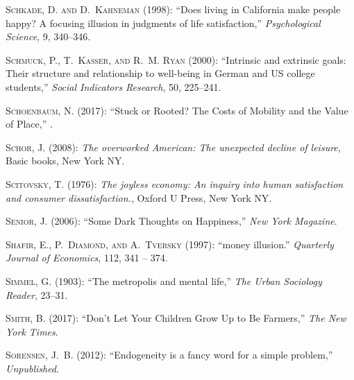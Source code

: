\documentclass[10pt, letterpaper]{article}
\begin{document}
\begin{spacing}{2.0}
\begin{thebibliography}{115}
\textsc{Schkade, D. and D.~Kahneman} (1998): \enquote{{Does living in
  California make people happy? A focusing illusion in judgments of life
  satisfaction},} \emph{Psychological Science}, 9, 340--346.

\textsc{Schmuck, P., T.~Kasser, and R.~M. Ryan} (2000): \enquote{Intrinsic and
  extrinsic goals: Their structure and relationship to well-being in German and
  US college students,} \emph{Social Indicators Research}, 50, 225--241.

\textsc{Schoenbaum, N.} (2017): \enquote{Stuck or Rooted? The Costs of Mobility
  and the Value of Place,} .

\textsc{Schor, J.} (2008): \emph{The overworked American: The unexpected
  decline of leisure}, Basic books, New York NY.

\textsc{Scitovsky, T.} (1976): \emph{The joyless economy: An inquiry into human
  satisfaction and consumer dissatisfaction.}, Oxford U Press, New York NY.

\textsc{Senior, J.} (2006): \enquote{Some Dark Thoughts on Happiness,}
  \emph{New York Magazine}.

\textsc{Shafir, E., P.~Diamond, and A.~Tversky} (1997): \enquote{money
  illusion.} \emph{Quarterly Journal of Economics}, 112, 341 -- 374.

\textsc{Simmel, G.} (1903): \enquote{The metropolis and mental life,} \emph{The
  Urban Sociology Reader}, 23--31.

\textsc{Smith, B.} (2017): \enquote{Don't Let Your Children Grow Up to Be
  Farmers,} \emph{The New York Times}.

\textsc{Sorensen, J.~B.} (2012): \enquote{Endogeneity is a fancy word for a
  simple problem,} \emph{Unpublished}.


\end{thebibliography}
\end{spacing}
\end{document}
